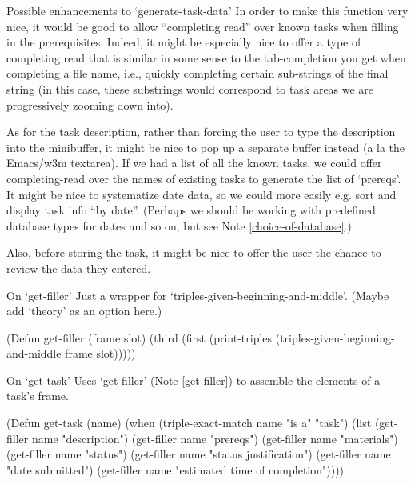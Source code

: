 \begin{notate}{Possible enhancements to `generate-task-data'}
In order to make this function very nice, it would be good
to allow ``completing read'' over known tasks when filling
in the prerequisites.  Indeed, it might be especially nice
to offer a type of completing read that is similar in some
sense to the tab-completion you get when completing a file
name, i.e., quickly completing certain sub-strings of the
final string (in this case, these substrings would
correspond to task areas we are progressively zooming down
into).

As for the task description, rather than forcing the user
to type the description into the minibuffer, it might be
nice to pop up a separate buffer instead (a la the
Emacs/w3m textarea).  If we had a list of all the known
tasks, we could offer completing-read over the names of
existing tasks to generate the list of `prereqs'.  It
might be nice to systematize date data, so we could more
easily e.g. sort and display task info ``by date''.
(Perhaps we should be working with predefined database
types for dates and so on; but see Note
\ref{choice-of-database}.)

Also, before storing the task, it might be nice to offer
the user the chance to review the data they entered.
\end{notate}

\begin{notate}{On `get-filler'} \label{get-filler}
Just a wrapper for `triples-given-beginning-and-middle'.
(Maybe add `theory' as an option here.)
\end{notate}

\begin{elisp}
(Defun get-filler (frame slot)
  (third (first
          (print-triples
           (triples-given-beginning-and-middle frame
                                               slot)))))
\end{elisp}

\begin{notate}{On `get-task'} \label{get-task}
Uses `get-filler' (Note \ref{get-filler}) to assemble the
elements of a task's frame.
\end{notate}

\begin{elisp}
(Defun get-task (name)
  (when (triple-exact-match name "is a" "task")
    (list (get-filler name "description")
          (get-filler name "prereqs")
          (get-filler name "materials")
          (get-filler name "status")
          (get-filler name "status justification")
          (get-filler name "date submitted")
          (get-filler name
                      "estimated time of completion"))))
\end{elisp}

